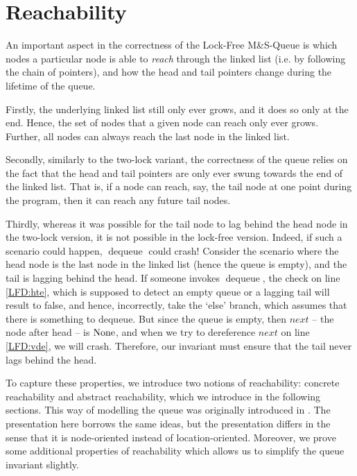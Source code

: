 \documentclass[a4paper, 11pt]{report}
\newcommand{\dequeue}{\operatorname{dequeue}}
\newcommand{\lfmsq}{Lock-Free M\&S-Queue\xspace}
\begin{document}
\section{Reachability}
\label{LFMSQ:section:reachability}

An important aspect in the correctness of the \lfmsq is which nodes a particular node is able to \textit{reach} through the linked list (i.e. by following the chain of pointers), and how the head and tail pointers change during the lifetime of the queue.

Firstly, the underlying linked list still only ever grows, and it does so only at the end. Hence, the set of nodes that a given node can reach only ever grows. Further, all nodes can always reach the last node in the linked list.

Secondly, similarly to the two-lock variant, the correctness of the queue relies on the fact that the head and tail pointers are only ever swung towards the end of the linked list. That is, if a node can reach, say, the tail node at one point during the program, then it can reach any future tail nodes.

Thirdly, whereas it was possible for the tail node to lag behind the head node in the two-lock version, it is not possible in the lock-free version. Indeed, if such a scenario could happen, $\dequeue$ could crash! Consider the scenario where the head node is the last node in the linked list (hence the queue is empty), and the tail is lagging behind the head. If someone invokes $\dequeue$, the check on line \ref{LFD:hte}, which is supposed to detect an empty queue or a lagging tail will result to false, and hence, incorrectly, take the `else' branch, which assumes that there is something to dequeue. But since the queue is empty, then $next$ -- the node after head -- is $\operatorname{None}$, and when we try to dereference $next$ on line \ref{LFD:vde}, we will crash. Therefore, our invariant must ensure that the tail never lags behind the head.

To capture these properties, we introduce two notions of reachability: concrete reachability and abstract reachability, which we introduce in the following sections. This way of modelling the queue was originally introduced in \cite{DBLP:conf/cpp/VindumB21}. The presentation here borrows the same ideas, but the presentation differs in the sense that it is node-oriented instead of location-oriented. Moreover, we prove some additional properties of reachability which allows us to simplify the queue invariant slightly.
\end{document}
